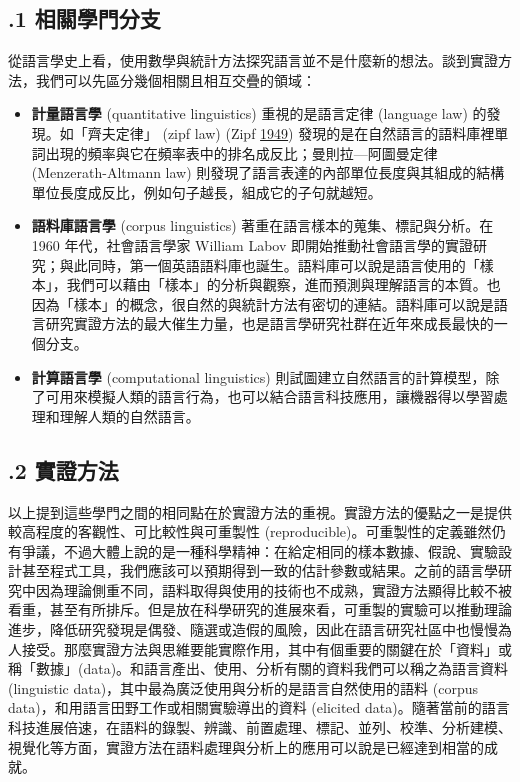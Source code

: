 \subsection{.1 相關學門分支}

從語言學史上看，使用數學與統計方法探究語言並不是什麼新的想法。談到實證方法，我們可以先區分幾個相關且相互交疊的領域：

\begin{itemize}
\item \textbf{計量語言學} (quantitative linguistics) 重視的是語言定律 (language law) 的發現。如「齊夫定律」 (zipf law) (Zipf \hyperlink{bookmarkid2lwamvv}{1949}) 發現的是在自然語言的語料庫裡單詞出現的頻率與它在頻率表中的排名成反比；曼則拉—阿圖曼定律 (Menzerath-Altmann law) 則發現了語言表達的內部單位長度與其組成的結構單位長度成反比，例如句子越長，組成它的子句就越短。

\item \textbf{語料庫語言學} (corpus linguistics) 著重在語言樣本的蒐集、標記與分析。在 1960 年代，社會語言學家 William Labov 即開始推動社會語言學的實證研究；與此同時，第一個英語語料庫也誕生。語料庫可以說是語言使用的「樣本」，我們可以藉由「樣本」的分析與觀察，進而預測與理解語言的本質。也因為「樣本」的概念，很自然的與統計方法有密切的連結。語料庫可以說是語言研究實證方法的最大催生力量，也是語言學研究社群在近年來成長最快的一個分支。

\item \textbf{計算語言學} (computational linguistics) 則試圖建立自然語言的計算模型，除了可用來模擬人類的語言行為，也可以結合語言科技應用，讓機器得以學習處理和理解人類的自然語言。

\end{itemize}
\subsection{.2 實證方法}

以上提到這些學門之間的相同點在於實證方法的重視。實證方法的優點之一是提供較高程度的客觀性、可比較性與可重製性 (reproducible)。可重製性的定義雖然仍有爭議，不過大體上說的是一種科學精神：在給定相同的樣本數據、假說、實驗設計甚至程式工具，我們應該可以預期得到一致的估計參數或結果。之前的語言學研究中因為理論側重不同，語料取得與使用的技術也不成熟，實證方法顯得比較不被看重，甚至有所排斥。但是放在科學研究的進展來看，可重製的實驗可以推動理論進步，降低研究發現是偶發、隨選或造假的風險，因此在語言研究社區中也慢慢為人接受。那麼實證方法與思維要能實際作用，其中有個重要的關鍵在於「資料」或稱「數據」(data)。和語言產出、使用、分析有關的資料我們可以稱之為語言資料 (linguistic data)，其中最為廣泛使用與分析的是語言自然使用的語料 (corpus data)，和用語言田野工作或相關實驗導出的資料 (elicited data)。隨著當前的語言科技進展倍速，在語料的錄製、辨識、前置處理、標記、並列、校準、分析建模、視覺化等方面，實證方法在語料處理與分析上的應用可以說是已經達到相當的成就。

